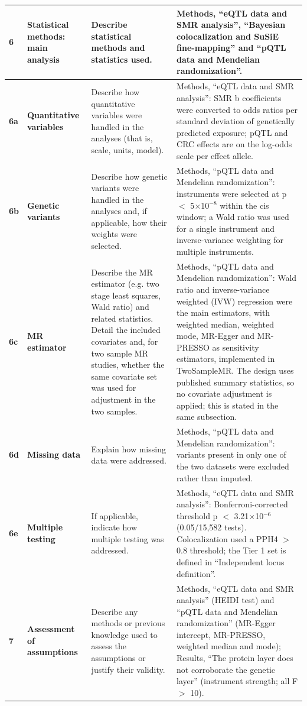 \documentclass[10pt,a4paper]{article}
\begin{document}
\begin{longtable}{@{}p{7mm}p{32mm}p{52mm}p{68mm}@{}}
\midrule
\textbf{6} & \textbf{Statistical methods: main analysis} & Describe statistical methods and statistics used. & Methods, ``eQTL data and SMR analysis'', ``Bayesian colocalization and SuSiE fine-mapping'' and ``pQTL data and Mendelian randomization''. \\
\midrule
\textbf{6a} & \textbf{Quantitative variables} & Describe how quantitative variables were handled in the analyses (that is, scale, units, model). & Methods, ``eQTL data and SMR analysis'': SMR b coefficients were converted to odds ratios per standard deviation of genetically predicted exposure; pQTL and CRC effects are on the log-odds scale per effect allele. \\
\midrule
\textbf{6b} & \textbf{Genetic variants} & Describe how genetic variants were handled in the analyses and, if applicable, how their weights were selected. & Methods, ``pQTL data and Mendelian randomization'': instruments were selected at p $<$ 5$\times$10$^{-8}$ within the cis window; a Wald ratio was used for a single instrument and inverse-variance weighting for multiple instruments. \\
\midrule
\textbf{6c} & \textbf{MR estimator} & Describe the MR estimator (e.g. two stage least squares, Wald ratio) and related statistics. Detail the included covariates and, for two sample MR studies, whether the same covariate set was used for adjustment in the two samples. & Methods, ``pQTL data and Mendelian randomization'': Wald ratio and inverse-variance weighted (IVW) regression were the main estimators, with weighted median, weighted mode, MR-Egger and MR-PRESSO as sensitivity estimators, implemented in TwoSampleMR. The design uses published summary statistics, so no covariate adjustment is applied; this is stated in the same subsection. \\
\midrule
\textbf{6d} & \textbf{Missing data} & Explain how missing data were addressed. & Methods, ``pQTL data and Mendelian randomization'': variants present in only one of the two datasets were excluded rather than imputed. \\
\midrule
\textbf{6e} & \textbf{Multiple testing} & If applicable, indicate how multiple testing was addressed. & Methods, ``eQTL data and SMR analysis'': Bonferroni-corrected threshold p $<$ 3.21$\times$10$^{-6}$ (0.05/15,582 tests). Colocalization used a PPH4 $>$ 0.8 threshold; the Tier 1 set is defined in ``Independent locus definition''. \\
\midrule
\textbf{7} & \textbf{Assessment of assumptions} & Describe any methods or previous knowledge used to assess the assumptions or justify their validity. & Methods, ``eQTL data and SMR analysis'' (HEIDI test) and ``pQTL data and Mendelian randomization'' (MR-Egger intercept, MR-PRESSO, weighted median and mode); Results, ``The protein layer does not corroborate the genetic layer'' (instrument strength; all F $>$ 10). \\

\end{longtable}
\end{document}

